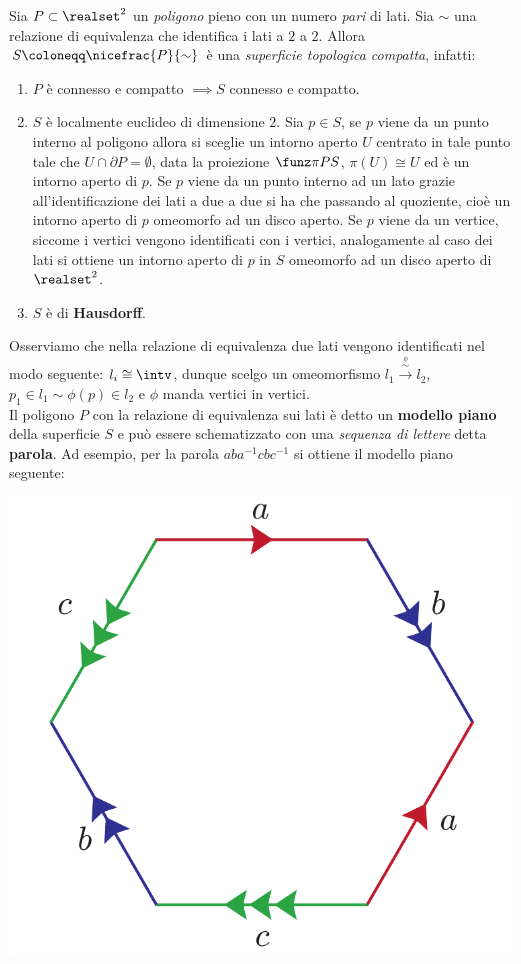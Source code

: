 \begin{observe}
	Sia $P\subset\realset^2$ un \textit{poligono} pieno con un numero \textit{pari} di lati. Sia $\sim$ una relazione di equivalenza che identifica i lati a $2$ a $2$. Allora $S\coloneqq\nicefrac{P}{\sim}$ è una \textit{superficie topologica compatta}, infatti:
		\begin{enumerate}
			\item  $P$ è connesso e compatto $\implies S$ connesso e compatto.
			\item $S$ è localmente euclideo di dimensione $2$. Sia $p\in S$, se $p$ viene da un punto interno al poligono allora si sceglie un intorno aperto $U$ centrato in tale punto tale che $U\cap\partial{P}=\emptyset$, data la proiezione $\funz \pi P S$, $\pi(U)\cong U$ ed è un intorno aperto di $p$. Se $p$ viene da un punto interno ad un lato grazie all'identificazione dei lati a due a due si ha che passando al quoziente, cioè un intorno aperto di $p$ omeomorfo ad un disco aperto. Se $p$ viene da un vertice, siccome i vertici vengono identificati con i vertici, analogamente al caso dei lati si ottiene un intorno aperto di $p$ in $S$ omeomorfo ad un disco aperto di $\realset^2$.
			\item $S$ è di \textbf{Hausdorff}.
		\end{enumerate}
	Osserviamo che nella relazione di equivalenza due lati vengono identificati nel modo seguente: $l_i\cong\intv$, dunque scelgo un omeomorfismo $l_1\stackrel{\stackrel{\phi}{\sim}}{\longrightarrow} l_2$, $p_1\in l_1 \sim \phi(p)\in l_2$ e $\phi$ manda vertici in vertici.\\
	Il poligono $P$ con la relazione di equivalenza sui lati è detto un \textbf{modello piano} della superficie $S$ e può essere schematizzato con una \textit{sequenza di lettere} detta \textbf{parola}. Ad esempio, per la parola $aba^{-1}cbc^{-1}$ si ottiene il modello piano seguente:
		\begin{center}
	\includegraphics[trim=0cm 0cm 0cm 0cm, clip, scale=0.4]{images/modellopiano.pdf}

\end{center}
\end{observe}
